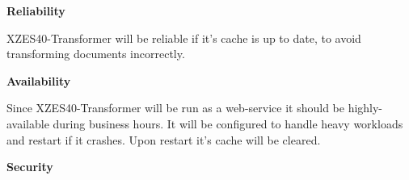 
\textbf{Reliability}

XZES40-Transformer will be reliable if it's cache is up to date, to avoid transforming documents incorrectly.


\textbf{Availability}

Since XZES40-Transformer will be run as a web-service it should be highly-available during business hours.
It will be configured to handle heavy workloads and restart if it crashes.
Upon restart it's cache will be cleared.


\textbf{Security}

